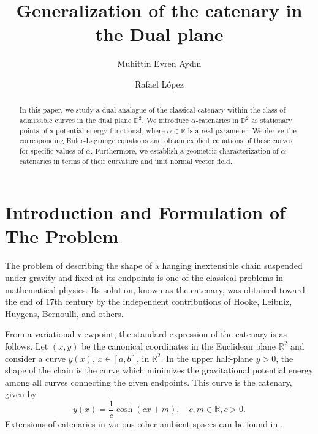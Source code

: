 \documentclass[a4paper,12pt]{amsart}
\theoremstyle{definition}
\def\r{\mathbb R}
\def\d{\mathsf d}
\def\d{\mathbb D}
\begin{document}
\title{Generalization of the catenary in the Dual plane}
 
\author{Muhittin Evren Aydın}
\address{Department of Mathematics, Faculty of Science, Firat University, Elazig,  23200 Turkey}
\author{Rafael L\'opez}
\address{Departamento de Geometr\'{\i}a y Topolog\'{\i}a Universidad de Granada 18071 Granada, Spain}
\begin{abstract}
In this paper, we study a dual analogue of the classical catenary within the class of admissible curves in the dual plane $\d^2$. We introduce $\alpha$-catenaries in $\d^2$ as stationary points of a potential energy functional, where $\alpha\in \r$ is a real parameter. We derive the corresponding Euler-Lagrange equations and obtain explicit equations of these curves for specific values of $\alpha$. Furthermore, we establish a geometric characterization of $\alpha$-catenaries in terms of their curvature and unit normal vector field.
\end{abstract}

 

\maketitle
\section{Introduction and Formulation of The Problem}

The problem of describing the shape of a hanging inextensible chain suspended under gravity and fixed at its endpoints is one of the classical problems in mathematical physics. Its solution, known as the catenary, was obtained toward the end of 17th century by the independent contributions of Hooke, Leibniz, Huygens, Bernoulli, and others.

From a variational viewpoint, the standard expression of the catenary is as follows. Let $(x,y)$ be the canonical coordinates in the Euclidean plane $\r^2$ and consider a curve $y(x)$, $x\in[a,b]$, in $\r^2$. In the upper half-plane $y>0$, the shape of the chain is the curve which minimizes the gravitational potential energy among all curves connecting the given endpoints. This curve is the catenary, given by
$$
y(x)=\frac1c\cosh(cx+m), \quad c,m\in \r, c>0.
$$
Extensions of catenaries in various other ambient spaces can be found in \cite{dl1,dl2,dl3,lo1,lo2,lo3}.
\end{document}
